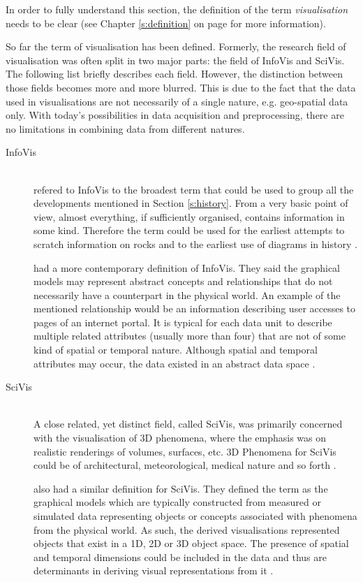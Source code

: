 In order to fully understand this section, the definition of the term \textit{visualisation} needs to be clear (see Chapter \ref{s:definition} on page \pageref{s:definition} for more information).

So far the term of visualisation has been defined. Formerly, the research field of visualisation was often split in two major parts: the field of \ac{InfoVis} and \ac{SciVis}. The following list briefly describes each field. However, the distinction between those fields becomes more and more blurred. This is due to the fact that the data used in visualisations are not necessarily of a single nature, e.g. geo-spatial data only. With today's possibilities in data acquisition and preprocessing, there are no limitations in combining data from different natures.

\begin{description}

\item[\acl{InfoVis}] \hfill \\
\citeauthor{Friendly.2001} refered to \ac{InfoVis} to the broadest term that could be used to group all the developments mentioned in Section \ref{s:history}. From a very basic point of view, almost everything, if sufficiently organised, contains information in some kind. Therefore the term could be used for the earliest attempts to scratch information on rocks and to the earliest use of diagrams in history .

\citeauthor{Ferreira2003} had a more contemporary definition of \ac{InfoVis}. They said the graphical models may represent abstract concepts and relationships that do not necessarily have a counterpart in the physical world. An example of the mentioned relationship would be an information describing user accesses to pages of an internet portal. It is typical for each data unit to describe multiple related attributes (usually more than four) that are not of some kind of spatial or temporal nature. Although spatial and temporal attributes may occur, the data existed in an abstract data space .
\newpage
\item[\acl{SciVis}] \hfill \\
A close related, yet distinct field, called \ac{SciVis}, was primarily concerned with the visualisation of 3D phenomena, where the emphasis was on realistic renderings of volumes, surfaces, etc. 3D Phenomena for \ac{SciVis} could be of architectural, meteorological, medical nature and so forth .

\citeauthor{Ferreira2003} also had a similar definition for \ac{SciVis}. They defined the term as the graphical models which are typically constructed from measured or simulated data representing objects or concepts associated with phenomena from the physical world. As such, the derived visualisations represented objects that exist in a 1D, 2D or 3D object space. The presence of spatial and temporal dimensions could be included in the data and thus are determinants in deriving visual representations from it .
\end{description}

